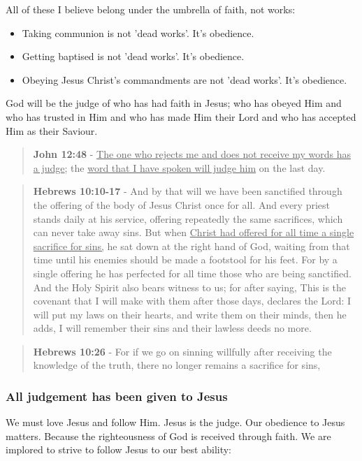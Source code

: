 \documentclass[11pt]{article}
\begin{document}
All of these I believe belong under the umbrella of faith, not works:
\begin{itemize}
\item Taking communion is not 'dead works'. It's obedience.
\item Getting baptised is not 'dead works'. It's obedience.
\item Obeying Jesus Christ's commandments are not 'dead works'. It's obedience.
\end{itemize}

God will be the judge of who has had faith in Jesus; who has obeyed Him and who has trusted in Him and who has made Him their Lord and who has accepted Him as their Saviour.

\begin{quote}
\textbf{John 12:48} - \uline{The one who rejects me and does not receive my words has a judge}; the \uline{word that I have spoken will judge him} on the last day.
\end{quote}

\begin{quote}
\textbf{Hebrews 10:10-17} - And by that will we have been sanctified through the offering of the body of Jesus Christ once for all. And every priest stands daily at his service, offering repeatedly the same sacrifices, which can never take away sins. But when \uline{Christ had offered for all time a single sacrifice for sins,} he sat down at the right hand of God, waiting from that time until his enemies should be made a footstool for his feet. For by a single offering he has perfected for all time those who are being sanctified. And the Holy Spirit also bears witness to us; for after saying, This is the covenant that I will make with them after those days, declares the Lord: I will put my laws on their hearts, and write them on their minds, then he adds, I will remember their sins and their lawless deeds no more.
\end{quote}

\begin{quote}
\textbf{Hebrews 10:26} - For if we go on sinning willfully after receiving the knowledge of the truth, there no longer remains a sacrifice for sins,
\end{quote}

\subsubsection{All judgement has been given to Jesus}
\label{sec:org824d540}
We must love Jesus and follow Him. Jesus is the judge.
Our obedience to Jesus matters. Because the righteousness of God is received through faith.
We are implored to strive to follow Jesus to our best ability:
\end{document}
